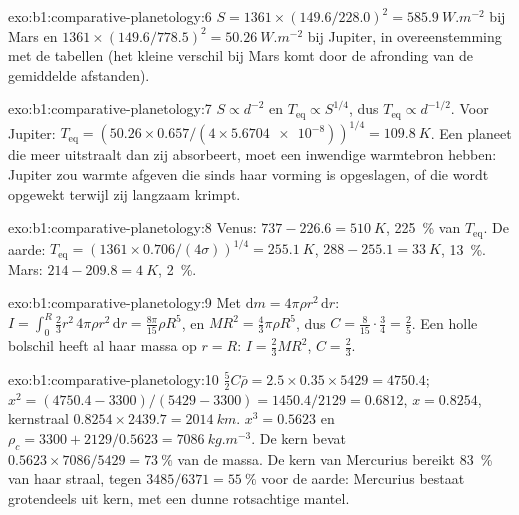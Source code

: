 \begin{solution}{exo:b1:comparative-planetology:6}
$S = 1361\times(149.6/228.0)^2 = \qty{585.9}{W.m^{-2}}$ bij Mars en
$1361\times(149.6/778.5)^2 = \qty{50.26}{W.m^{-2}}$ bij Jupiter, in overeenstemming
met de tabellen (het kleine verschil bij Mars komt door de afronding van de gemiddelde afstanden).
\end{solution}

\begin{solution}{exo:b1:comparative-planetology:7}
$S \propto d^{-2}$ en $T_\mathrm{eq} \propto S^{1/4}$, dus $T_\mathrm{eq}
\propto d^{-1/2}$. Voor Jupiter: $T_\mathrm{eq} = (50.26\times0.657/(4\times
\num{5.6704e-8}))^{1/4} = \qty{109.8}{K}$. Een planeet die meer uitstraalt dan zij
absorbeert, moet een inwendige warmtebron hebben: Jupiter zou warmte afgeven die sinds haar vorming
is opgeslagen, of die wordt opgewekt terwijl zij langzaam krimpt.
\end{solution}

\begin{solution}{exo:b1:comparative-planetology:8}
Venus: $737 - 226.6 = \qty{510}{K}$, \qty{225}{\percent} van $T_\mathrm{eq}$.
De aarde: $T_\mathrm{eq} = (1361\times0.706/(4\sigma))^{1/4} = \qty{255.1}{K}$,
$288 - 255.1 = \qty{33}{K}$, \qty{13}{\percent}. Mars: $214 - 209.8 =
\qty{4}{K}$, \qty{2}{\percent}.
\end{solution}

\begin{solution}{exo:b1:comparative-planetology:9}
Met $\mathrm dm = 4\pi\rho r^2\,\mathrm dr$: $I = \int_0^R\tfrac23r^2\,4\pi
\rho r^2\,\mathrm dr = \tfrac{8\pi}{15}\rho R^5$, en $MR^2 = \tfrac43\pi\rho
R^5$, dus $C = \tfrac{8}{15}\cdot\tfrac34 = \tfrac25$. Een holle bolschil heeft al haar massa
op $r = R$: $I = \tfrac23MR^2$, $C = \tfrac23$.
\end{solution}

\begin{solution}{exo:b1:comparative-planetology:10}
$\tfrac52C\bar\rho = 2.5\times0.35\times5429 = 4750.4$;
$x^2 = (4750.4 - 3300)/(5429 - 3300) = 1450.4/2129 = 0.6812$, $x = 0.8254$,
kernstraal $0.8254\times2439.7 = \qty{2014}{km}$. $x^3 = 0.5623$ en
$\rho_c = 3300 + 2129/0.5623 = \qty{7086}{kg.m^{-3}}$. De kern bevat
$0.5623\times7086/5429 = \qty{73}{\percent}$ van de massa. De kern van Mercurius
bereikt \qty{83}{\percent} van haar straal, tegen $3485/6371 =
\qty{55}{\percent}$ voor de aarde: Mercurius bestaat grotendeels uit kern, met een dunne
rotsachtige mantel.
\end{solution}

